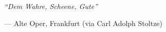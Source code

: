 \vspace*{\fill}
\epigraph{\textit{``Dem Wahre, Scheene, Gute''}}{--- Alte Oper, Frankfurt (via Carl Adolph Stoltze)}
\vspace*{\fill}
\thispagestyle{empty} %
\newpage